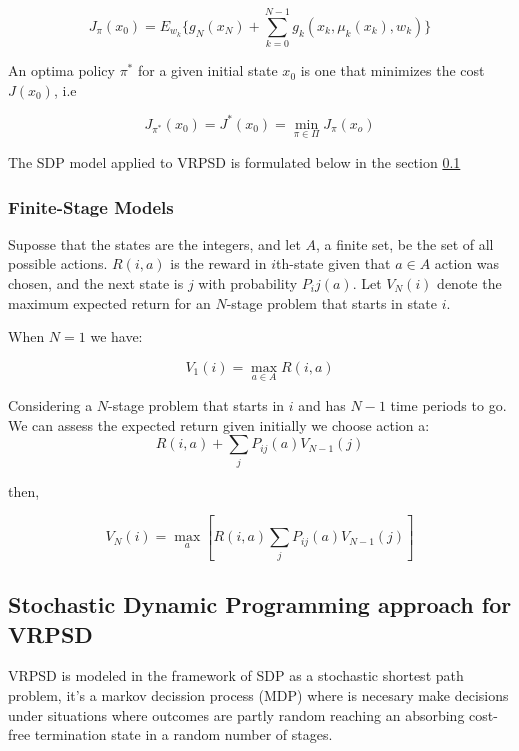 \begin{equation}\label{eq:SDP_expected_cost_policy}
 J_\pi(x_0) = E_{w_k}\biggr\{g_N(x_N)+\sum_{k=0}^{N-1}g_k(x_k,\mu_k(x_k),w_k)\biggr\}
\end{equation}

An optima policy $\pi^*$ for a given initial state $x_0$ is one that minimizes the cost $J(x_0)$, i.e

\[J_{\pi^*}(x_0)=J^*(x_0)=\min\limits_{\pi\in\Pi}J_\pi(x_o)\]


The SDP model applied to VRPSD is formulated below in the section \ref{sec:SDP_model_VRPSD}


\subsubsection{Finite-Stage Models}%


Suposse that the states are the integers, and let $A$, a finite set, be the set of all possible actions.
$R(i,a)$ is the reward in $i$th-state given that $a \in A$ action was chosen, and the next state is $j$ with probability $P_ij(a)$.
Let $V_N(i)$ denote the maximum expected return for an $N$-stage problem that starts in state $i$.

When $N=1$ we have:

\begin{equation}\label{eq:maxValueN=1}
 V_1(i) =  \max_{a\in A}R(i,a)
\end{equation}

Considering a $N$-stage problem that starts in $i$ and has $N-1$ time periods to go. We can assess the expected return given initially we choose action a:
\[R(i,a)+\sum_jP_{ij}(a)V_{N-1}(j)\]

then,

\begin{equation}
 V_N(i)=\max_a[R(i,a)\sum_jP_{ij}(a)V_{N-1}(j)]
\end{equation}


\subsection{Stochastic Dynamic Programming approach for VRPSD}\label{sec:SDP_model_VRPSD}

VRPSD is modeled in the framework of SDP as a stochastic shortest path problem, it's a markov decission process (MDP) where is necesary make decisions under situations where outcomes are partly random reaching an absorbing cost-free termination state in a random number of stages.

